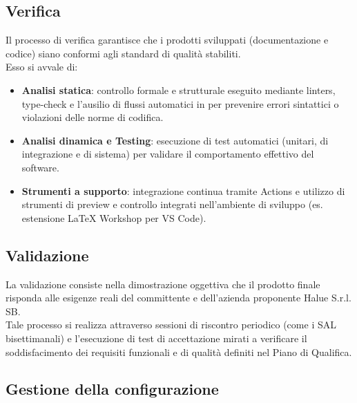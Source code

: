 \subsection{Verifica}
Il processo di verifica garantisce che i prodotti sviluppati (documentazione e codice) siano conformi agli standard di qualità stabiliti. \\
Esso si avvale di:
\begin{itemize}
    \item \textbf{Analisi statica}: controllo formale e strutturale eseguito mediante linters, type-check e l'ausilio di flussi automatici in  per prevenire errori sintattici o violazioni delle norme di codifica.
    \item \textbf{Analisi dinamica e Testing}: esecuzione di test automatici (unitari, di integrazione e di sistema) per validare il comportamento effettivo del software.
    \item \textbf{Strumenti a supporto}: integrazione continua tramite  Actions e utilizzo di strumenti di preview e controllo integrati nell'ambiente di sviluppo (es. estensione LaTeX Workshop per VS Code).
\end{itemize}

\subsection{Validazione}
La validazione consiste nella dimostrazione oggettiva che il prodotto finale risponda alle esigenze reali del committente e dell'azienda proponente Halue S.r.l. SB. \\
Tale processo si realizza attraverso sessioni di riscontro periodico (come i SAL bisettimanali) e l'esecuzione di test di accettazione mirati a verificare il soddisfacimento dei requisiti funzionali e di qualità definiti nel Piano di Qualifica.

\subsection{Gestione della configurazione}
